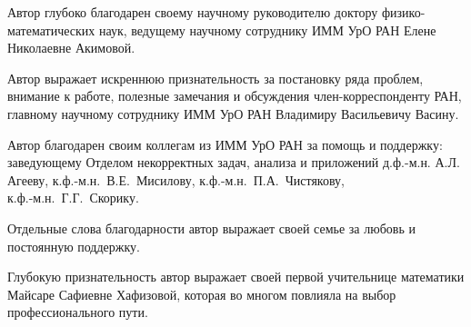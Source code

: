 Автор глубоко благодарен своему научному руководителю доктору физико-математических наук, ведущему научному сотруднику ИММ УрО РАН Елене Николаевне Акимовой.

Автор выражает искреннюю признательность за постановку ряда проблем, внимание к работе, полезные замечания и обсуждения член-корреспонденту РАН, главному научному сотруднику ИММ УрО РАН Владимиру Васильевичу Васину.

Автор благодарен своим коллегам из ИММ УрО РАН за помощь и поддержку: заведующему Отделом некорректных задач, анализа и приложений д.ф.-м.н. А.Л. Агееву, к.ф.-м.н.~В.Е.~Мисилову, к.ф.-м.н.~П.А.~Чистякову, \\к.ф.-м.н.~Г.Г.~Скорику.

Отдельные слова благодарности автор выражает своей семье за любовь и постоянную поддержку.

Глубокую признательность автор выражает своей первой учительнице математики Майсаре Сафиевне Хафизовой, которая во многом повлияла на выбор профессионального пути.


